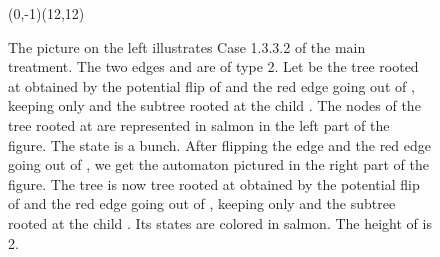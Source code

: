 \documentclass[11pt,a4paper]{article}
\begin{document}
\begin{itemize}
\begin{figure}[htbp]
{\begin{VCPicture}{(0,-1)(12,12)}
{
\RstStateFillColor 
{}
}
\end{VCPicture}}
        \caption{ The picture on the left illustrates Case 1.3.3.2 of
          the main treatment. The two edges  and
           are of type 2.  Let  be the tree
          rooted at  obtained by the potential flip of
           and the red edge going out of , keeping
          only  and the subtree rooted at the child . The
          nodes of the tree  rooted at  are represented in
          salmon in the left part of the figure. The state  is a
          bunch. After flipping the edge  and the red
          edge going out of , we get the automaton pictured in
          the right part of the figure.  The tree  is now tree
          rooted at  obtained by the potential flip of
           and the red edge going out of , keeping
          only  and the subtree rooted at the child . Its
          states are colored in salmon. The height of  is 2.}
\label{figure.cluster4}
\end{figure}





\end{itemize}
\end{document}
